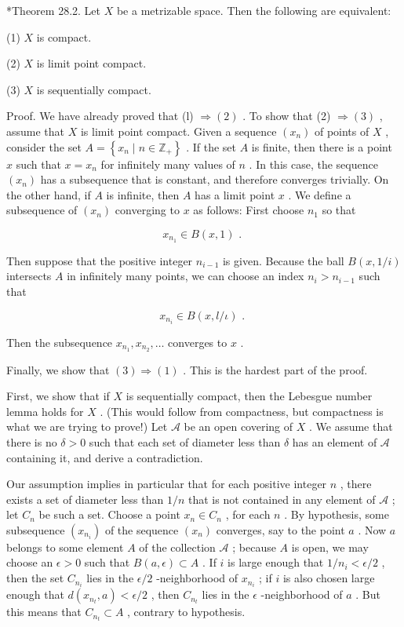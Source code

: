 \documentclass[10pt]{article}
\begin{document}
*Theorem 28.2. Let \(X\) be a metrizable space. Then the following are equivalent:

(1) \(X\) is compact.

(2) \(X\) is limit point compact.

(3) \(X\) is sequentially compact.

Proof. We have already proved that (l) \(\Rightarrow  \left( 2\right)\) . To show that (2) \(\Rightarrow  \left( 3\right)\) , assume that \(X\) is limit point compact. Given a sequence \(\left( {x}_{n}\right)\) of points of \(X\) , consider the set \(A = \left\{  {{x}_{n} \mid  n \in  {\mathbb{Z}}_{ + }}\right\}\) . If the set \(A\) is finite, then there is a point \(x\) such that \(x = {x}_{n}\) for infinitely many values of \(n\) . In this case, the sequence \(\left( {x}_{n}\right)\) has a subsequence that is constant, and therefore converges trivially. On the other hand, if \(A\) is infinite, then \(A\) has a limit point \(x\) . We define a subsequence of \(\left( {x}_{n}\right)\) converging to \(x\) as follows: First choose \({n}_{1}\) so that

\[
{x}_{{n}_{1}} \in  B\left( {x,1}\right) \text{ . }
\]

Then suppose that the positive integer \({n}_{i - 1}\) is given. Because the ball \(B\left( {x,1/i}\right)\) intersects \(A\) in infinitely many points, we can choose an index \({n}_{i} > {n}_{i - 1}\) such that

\[
{x}_{{n}_{i}} \in  B\left( {x,l/\iota }\right) \text{ . }
\]

Then the subsequence \({x}_{{n}_{1}},{x}_{{n}_{2}},\ldots\) converges to \(x\) .

Finally, we show that \(\left( 3\right)  \Rightarrow  \left( 1\right)\) . This is the hardest part of the proof.

First, we show that if \(X\) is sequentially compact, then the Lebesgue number lemma holds for \(X\) . (This would follow from compactness, but compactness is what we are trying to prove!) Let \(\mathcal{A}\) be an open covering of \(X\) . We assume that there is no \(\delta  > 0\) such that each set of diameter less than \(\delta\) has an element of \(\mathcal{A}\) containing it, and derive a contradiction.

Our assumption implies in particular that for each positive integer \(n\) , there exists a set of diameter less than \(1/n\) that is not contained in any element of \(\mathcal{A}\) ; let \({C}_{n}\) be such a set. Choose a point \({x}_{n} \in  {C}_{n}\) , for each \(n\) . By hypothesis, some subsequence \(\left( {x}_{{n}_{i}}\right)\) of the sequence \(\left( {x}_{n}\right)\) converges, say to the point \(a\) . Now \(a\) belongs to some element \(A\) of the collection \(\mathcal{A}\) ; because \(A\) is open, we may choose an \(\epsilon  > 0\) such that \(B\left( {a,\epsilon }\right)  \subset  A\) . If \(i\) is large enough that \(1/{n}_{i} < \epsilon /2\) , then the set \({C}_{{n}_{i}}\) lies in the \(\epsilon /2\) -neighborhood of \({x}_{{n}_{i}}\) ; if \(i\) is also chosen large enough that \(d\left( {{x}_{{n}_{t}},a}\right)  < \epsilon /2\) , then \({C}_{{n}_{t}}\) lies in the \(\epsilon\) -neighborhood of \(a\) . But this means that \({C}_{{n}_{t}} \subset  A\) , contrary to hypothesis.
\end{document}
